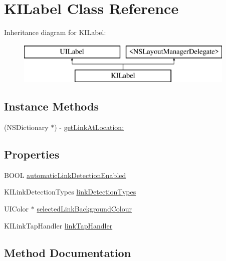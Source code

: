 \hypertarget{interface_k_i_label}{}\section{K\+I\+Label Class Reference}
\label{interface_k_i_label}
Inheritance diagram for K\+I\+Label\+:\begin{figure}[H]
\begin{center}
\leavevmode
\includegraphics[height=2.000000cm]{interface_k_i_label}
\end{center}
\end{figure}
\subsection*{Instance Methods}
\begin{DoxyCompactItemize}
\item 
(N\+S\+Dictionary $\ast$) -\/ \hyperlink{interface_k_i_label_a5267accca558230ee72c4300f59b4d12}{get\+Link\+At\+Location\+:}
\end{DoxyCompactItemize}
\subsection*{Properties}
\begin{DoxyCompactItemize}
\item 
B\+O\+O\+L \hyperlink{interface_k_i_label_a3960ba72e6056ed488fbee19bf444a11}{automatic\+Link\+Detection\+Enabled}
\item 
K\+I\+Link\+Detection\+Types \hyperlink{interface_k_i_label_a0430592250bca24449465bc33abc6c5c}{link\+Detection\+Types}
\item 
U\+I\+Color $\ast$ \hyperlink{interface_k_i_label_a772174afd3598ed42c8f2e65b3d2803f}{selected\+Link\+Background\+Colour}
\item 
K\+I\+Link\+Tap\+Handler \hyperlink{interface_k_i_label_afe21f3eadca6a1aeca6081f4a075cbd9}{link\+Tap\+Handler}
\end{DoxyCompactItemize}


\subsection{Method Documentation}
\hypertarget{interface_k_i_label_a5267accca558230ee72c4300f59b4d12}{}

